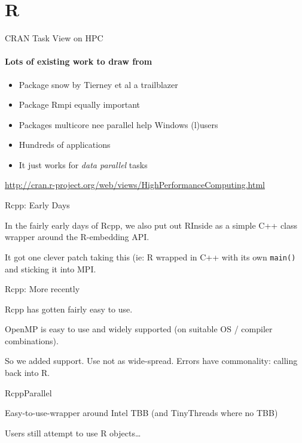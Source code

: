 \documentclass[12pt,ignorenonframetext,compress]{beamer}
\begin{document}
\section{R}\label{r}

\begin{frame}{CRAN Task View on HPC}

\framesubtitle{Lots of existing work to draw from}

\begin{itemize}
\itemsep1pt\parskip0pt
\item
  Package snow by Tierney et al a trailblazer
\item
  Package Rmpi equally important
\item
  Packages multicore nee parallel help Windows (l)users
\item
  Hundreds of applications
\item
  It just works for \emph{data parallel} tasks
\end{itemize}

\url{http://cran.r-project.org/web/views/HighPerformanceComputing.html}

\end{frame}

\begin{frame}{Rcpp: Early Days}

In the fairly early days of Rcpp, we also put out RInside as a simple
C++ class wrapper around the R-embedding API.

It got one clever patch taking this (ie: R wrapped in C++ with its own
\texttt{main()} and sticking it into MPI.

\end{frame}

\begin{frame}{Rcpp: More recently}

Rcpp has gotten fairly easy to use.

OpenMP is easy to use and widely supported (on suitable OS / compiler
combinations).

So we added support. Use not as wide-spread. Errors have commonality:
calling back into R.

\end{frame}

\begin{frame}{RcppParallel}

Easy-to-use-wrapper around Intel TBB (and TinyThreads where no TBB)

Users still attempt to use R objects\ldots{}

\end{frame}
\end{document}

